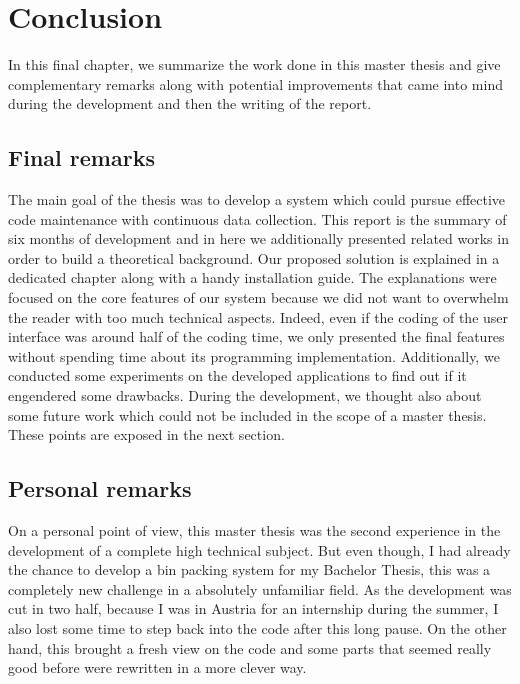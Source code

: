 \chapter{Conclusion} %
\label{chap:conclusion}

In this final chapter, we summarize the work done in this master thesis and give complementary remarks along with potential improvements that came into mind during the development and then the writing of the report.

\section{Final remarks}
The main goal of the thesis was to develop a system which could pursue effective code maintenance with continuous data collection. This report is the summary of six months of development and in here we additionally presented related works in order to build a theoretical background. Our proposed solution is explained in a dedicated chapter along with a handy installation guide. The explanations were focused on the core features of our system because we did not want to overwhelm the reader with too much technical aspects. Indeed, even if the coding of the user interface was around half of the coding time, we only presented the final features without spending time about its programming implementation.  Additionally, we conducted some experiments on the developed applications to find out if it engendered some drawbacks. During the development, we thought also about some future work which could not be included in the scope of a master thesis. These points are exposed in the next section.

\section{Personal remarks}

On a personal point of view, this master thesis was the second experience in the development of a complete high technical subject. But even though, I had already the chance to develop a bin packing system for my Bachelor Thesis, this was a completely new challenge in a absolutely unfamiliar field. As the development was cut in two half, because I was in Austria for an internship during the summer, I also lost some time to step back into the code after this long pause. On the other hand, this brought a fresh view on the code and some parts that seemed really good before were rewritten in a more clever way.

